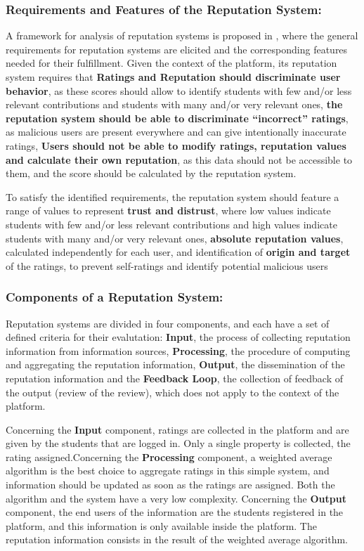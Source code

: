 \documentclass{llncs}
\begin{document}
\subsubsection{Requirements and Features of the Reputation System:}

A framework for analysis of reputation systems is proposed in \cite{vavilis2014reference}, where the general requirements for reputation systems are elicited and the corresponding features needed for their fulfillment. Given the context of the platform, its reputation system requires that \textbf{Ratings and Reputation should discriminate user behavior}, as these scores should allow to identify students with few and/or less relevant contributions and students with many and/or very relevant ones, \textbf{the reputation system should be able to discriminate ``incorrect'' ratings}, as malicious users are present everywhere and can give intentionally inaccurate ratings, \textbf{Users should not be able to modify ratings, reputation values and calculate their own reputation}, as this data should not be accessible to them, and the score should be calculated by the reputation system.

To satisfy the identified requirements, the reputation system should feature a range of values to represent \textbf{trust and distrust}, where low values indicate students with few and/or less relevant contributions and high values indicate students with many and/or very relevant ones, \textbf{absolute reputation values}, calculated independently for each user, and identification of \textbf{origin and target} of the ratings, to prevent self-ratings and identify potential malicious users

\subsubsection{Components of a Reputation System:}
Reputation systems are divided in four components\cite{liu2012systematic,liu2010evaluation}, and each have a set of defined criteria for their evalutation: \textbf{Input}, the process of collecting reputation information from information sources, \textbf{Processing}, the procedure of computing and aggregating the reputation information, \textbf{Output}, the dissemination of the reputation information and the \textbf{Feedback Loop}, the collection of feedback of the output (review of the review), which does not apply to the context of the platform.

Concerning the \textbf{Input} component, ratings are collected in the platform and are given by the students that are logged in. Only a single property is collected, the rating assigned.Concerning the \textbf{Processing} component, a weighted average algorithm is the best choice to aggregate ratings in this simple system, and information should be updated as soon as the ratings are assigned. Both the algorithm and the system have a very low complexity. Concerning the \textbf{Output} component, the end users of the information are the students registered in the platform, and this information is only available inside the platform. The reputation information consists in the result of the weighted average algorithm.
\end{document}

